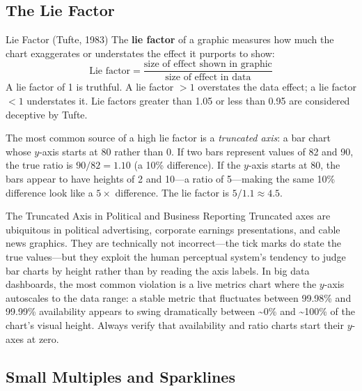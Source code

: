 \subsection{The Lie Factor}
\label{subsec:lie-factor}

\begin{defbox}{Lie Factor (Tufte, 1983)}
The \textbf{lie factor} of a graphic measures how much the chart
exaggerates or understates the effect it purports to show:
\[
  \text{Lie factor} =
  \frac{\text{size of effect shown in graphic}}
       {\text{size of effect in data}}
\]
A lie factor of 1 is truthful. A lie factor $>1$ overstates the data
effect; a lie factor $<1$ understates it. Lie factors greater than
1.05 or less than 0.95 are considered deceptive by Tufte.
\end{defbox}

The most common source of a high lie factor is a \emph{truncated axis}:
a bar chart whose $y$-axis starts at 80 rather than 0. If two bars
represent values of 82 and 90, the true ratio is $90/82 = 1.10$
(a 10\% difference). If the $y$-axis starts at 80, the bars appear to
have heights of 2 and 10---a ratio of 5---making the same 10\% difference
look like a $5\times$ difference. The lie factor is $5/1.1 \approx 4.5$.

\begin{caution}{The Truncated Axis in Political and Business Reporting}
Truncated axes are ubiquitous in political advertising, corporate
earnings presentations, and cable news graphics. They are technically
not incorrect---the tick marks do state the true values---but they
exploit the human perceptual system's tendency to judge bar charts by
height rather than by reading the axis labels. In big data dashboards,
the most common violation is a live metrics chart where the $y$-axis
autoscales to the data range: a stable metric that fluctuates between
99.98\% and 99.99\% availability appears to swing dramatically between
\textasciitilde{}0\% and \textasciitilde{}100\% of the chart's visual height. Always verify that
availability and ratio charts start their $y$-axes at zero.
\end{caution}

\subsection{Small Multiples and Sparklines}
\label{subsec:small-multiples}

